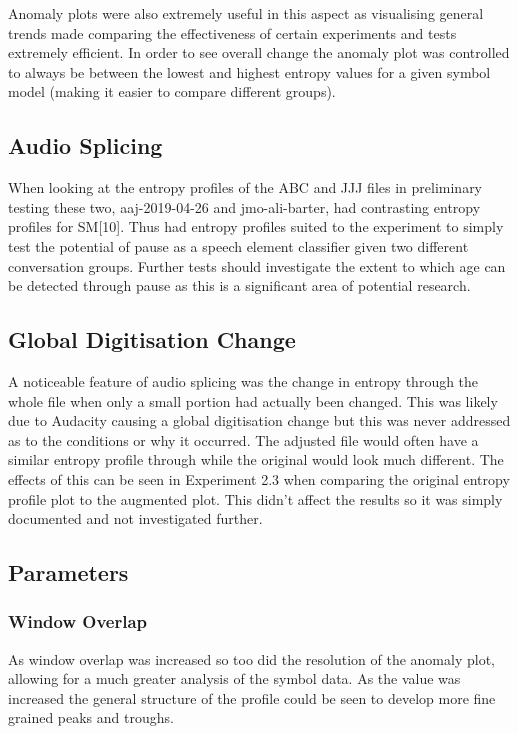 Anomaly plots were also extremely useful in this aspect as visualising general trends made comparing the effectiveness of certain experiments and tests extremely efficient. In order to see overall change the anomaly plot was controlled to always be between the lowest and highest entropy values for a given symbol model (making it easier to compare different groups).\\

\subsection{Audio Splicing}
When looking at the entropy profiles of the ABC and JJJ files in preliminary testing these two, aaj-2019-04-26 and jmo-ali-barter, had contrasting entropy profiles for SM[10]. Thus had entropy profiles suited to the experiment to simply test the potential of pause as a speech element classifier given two different conversation groups. Further tests should investigate the extent to which age can be detected through pause as this is a significant area of potential research.  

\subsection{Global Digitisation Change}
A noticeable feature of audio splicing was the change in entropy through the whole file when only a small portion had actually been changed. This was likely due to Audacity causing a global digitisation change but this was never addressed as to the conditions or why it occurred. The adjusted file would often have a similar entropy profile through while the original would look much different. The effects of this can be seen in Experiment 2.3 when comparing the original entropy profile plot to the augmented plot. This didn't affect the results so it was simply documented and not investigated further.

\subsection{Parameters}
\subsubsection{Window Overlap}
As window overlap was increased so too did the resolution of the anomaly plot, allowing for a much greater analysis of the symbol data. As the value was increased the general structure of the profile could be seen to develop more fine grained peaks and troughs. \\

